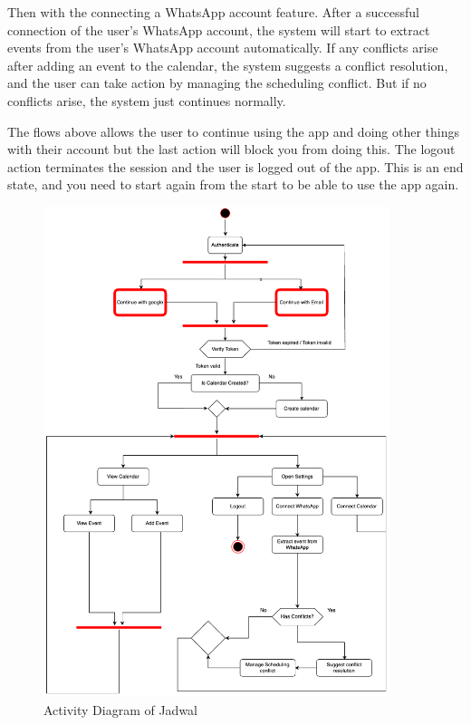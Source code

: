 Then with the connecting a WhatsApp account feature. After a successful connection of the user's WhatsApp account, the system will start to extract events from the user's WhatsApp account automatically. If any conflicts arise after adding an event to the calendar, the system suggests a conflict resolution, and the user can take action by managing the scheduling conflict. But if no conflicts arise, the system just continues normally.

The flows above allows the user to continue using the app and doing other things with their account but the last action will block you from doing this. The logout action  terminates the session and the user is logged out of the app. This is an end state, and you need to start again from the start to be able to use the app again.

\begin{figure}[!h]
    \centering
    \includegraphics[width=0.9\textwidth]{images/activity-diagram.png}
    \caption{Activity Diagram of Jadwal}
    \label{fig:activity-diagram}
\end{figure}